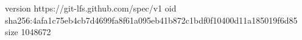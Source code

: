 version https://git-lfs.github.com/spec/v1
oid sha256:4afa1c75eb4cb7d4699fa8f61a095eb41b872c1bdf0f10400d11a185019f6d85
size 1048672
